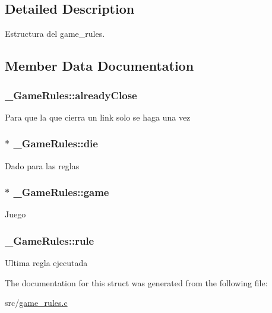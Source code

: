 \subsection{Detailed Description}
Estructura del game\+\_\+rules. 

\subsection{Member Data Documentation}
\hypertarget{struct__GameRules_a59eb128d579db73908e0a8367ad6fc24}{
\subsubsection[{already\+Close}]{ \+\_\+\+Game\+Rules\+::already\+Close}}\label{struct__GameRules_a59eb128d579db73908e0a8367ad6fc24}
Para que la que cierra un link solo se haga una vez \hypertarget{struct__GameRules_af45785d6ef48c6b615f0f40f0b70f0bf}{
\subsubsection[{die}]{$\ast$ \+\_\+\+Game\+Rules\+::die}}\label{struct__GameRules_af45785d6ef48c6b615f0f40f0b70f0bf}
Dado para las reglas \hypertarget{struct__GameRules_ad68f49101c1660649f387684f91af11a}{
\subsubsection[{game}]{$\ast$ \+\_\+\+Game\+Rules\+::game}}\label{struct__GameRules_ad68f49101c1660649f387684f91af11a}
Juego \hypertarget{struct__GameRules_a6f510ad31232ca35a09da4a6e12ed78b}{
\subsubsection[{rule}]{ \+\_\+\+Game\+Rules\+::rule}}\label{struct__GameRules_a6f510ad31232ca35a09da4a6e12ed78b}
Ultima regla ejecutada 

The documentation for this struct was generated from the following file\+:\begin{DoxyCompactItemize}
\item 
src/\hyperlink{game__rules_8c}{game\+\_\+rules.\+c}\end{DoxyCompactItemize}
